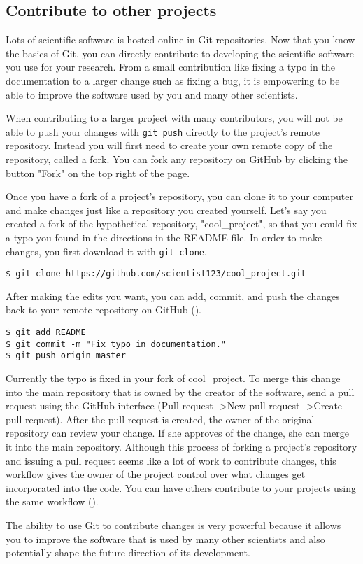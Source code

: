 \subsection{Contribute to other projects}

Lots of scientific software is hosted online in Git repositories.
Now that you know the basics of Git, you can directly contribute to developing the scientific software you use for your research.
From a small contribution like fixing a typo in the documentation to a larger change such as fixing a bug, it is empowering to be able to improve the software used by you and many other scientists.

When contributing to a larger project with many contributors, you will not be able to push your changes with \verb|git push| directly to the project's remote repository.
Instead you will first need to create your own remote copy of the repository, called a fork.
You can fork any repository on GitHub by clicking the button "Fork" on the top right of the page.

Once you have a fork of a project's repository, you can clone it to your computer and make changes just like a repository you created yourself.
Let's say you created a fork of the hypothetical repository, "cool\_project", so that you could fix a typo you found in the directions in the README file.
In order to make changes, you first download it with \verb|git clone|.

\begin{lstlisting}
$ git clone https://github.com/scientist123/cool_project.git
\end{lstlisting}

After making the edits you want, you can add, commit, and push the changes back to your remote repository on GitHub (\label{fig:Fig3}).

\begin{lstlisting}
$ git add README
$ git commit -m "Fix typo in documentation."
$ git push origin master
\end{lstlisting}

Currently the typo is fixed in your fork of cool\_project.
To merge this change into the main repository that is owned by the creator of the software, send a pull request using the GitHub interface (Pull request -\textgreater New pull request -\textgreater Create pull request).
After the pull request is created, the owner of the original repository can review your change.
If she approves of the change, she can merge it into the main repository.
Although this process of forking a project’s repository and issuing a pull request seems like a lot of work to contribute changes, this workflow gives the owner of the project control over what changes get incorporated into the code. You can have others contribute to your projects using the same workflow (\label{fig:S1_Fig}). 

The ability to use Git to contribute changes is very powerful because it allows you to improve the software that is used by many other scientists and also potentially shape the future direction of its development.
